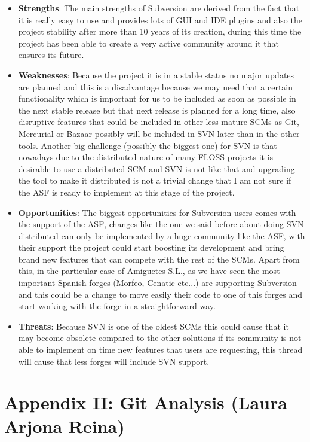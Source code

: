 \documentclass[a4paper,10pt]{article}
\begin{document}
\begin{itemize}
\item \textbf{Strengths}: The main strengths of Subversion are derived from the fact that it is really easy to use and provides lots of GUI and IDE plugins and also the project stability after more than 10 years of its creation, during this time the project has been able to create a very active community around it that ensures its future.
\item \textbf{Weaknesses}: Because the project it is in a stable status no major updates are planned and this is a disadvantage because we may need that a certain functionality which is important for us to be included as soon as possible in the next stable release but that next release is planned for a long time, also disruptive features that could be included in other less-mature SCMs as Git, Mercurial or Bazaar possibly will be included in SVN later than in the other tools. Another big challenge (possibly the biggest one) for SVN is that nowadays due to the distributed nature of many FLOSS projects it is desirable to use a distributed SCM and SVN is not like that and upgrading the tool to make it distributed is not a trivial change that I am not sure if the ASF is ready to implement at this stage of the project. 
\item \textbf{Opportunities}: The biggest opportunities for Subversion users comes with the support of the ASF, changes like the one we said before about doing SVN distributed can only be implemented by a huge community like the ASF, with their support the project could start boosting its development and bring brand new features that can compete with the rest of the SCMs. Apart from this, in the particular case of Amiguetes S.L., as we have seen the most important Spanish forges (Morfeo, Cenatic etc...) are supporting Subversion and this could be a change to move easily their code to one of this forges and start working with the forge in a straightforward way.
\item \textbf{Threats}: Because SVN is one of the oldest SCMs this could cause that it may become obsolete compared to the other solutions if its community is not able to implement on time new features that users are requesting, this thread will cause that less forges will include SVN support.
\end{itemize}

\newpage

\section{Appendix II: Git Analysis (Laura Arjona Reina)} \label{Git Appendix}
\end{document}

